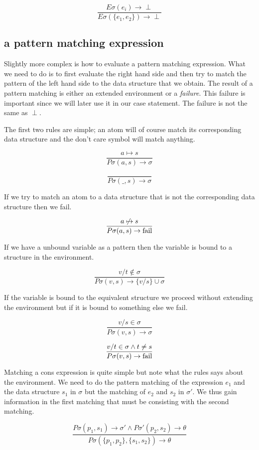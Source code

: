 \documentclass[a4paper,11pt]{article}
\begin{document}
$$\frac{ E\sigma(e_i) \rightarrow \perp }{E\sigma(\lbrace e_1 , e_2\rbrace) \rightarrow \perp}$$


\subsection{a pattern matching expression}

Slightly more complex is how to evaluate a pattern matching
expression. What we need to do is to first evaluate the right hand
side and then try to match the pattern of the left hand side to the
data structure that we obtain. The result of a pattern matching is
either an extended environment or a {\em failure}. This failure is
important since we will later use it in our case statement. The
failure is not the same as $\perp$.

The first two rules are simple; an atom will of course match its
corresponding data structure and the don't care symbol will match
anything.

$$\frac{a \mapsto s}{P\sigma(a, s) \rightarrow \sigma}$$ 

$$\frac{}{P\sigma(\_,s) \rightarrow \sigma}$$

If we try to match an atom to a data structure that is not the
corresponding data structure then we fail.

$$\frac{a \not\mapsto s}{P\sigma(a, s) \rightarrow {\rm fail}}$$ 

If we have a unbound variable as a pattern then the variable is bound to a
structure in the environment. 

$$\frac{v/t \not\in \sigma}{P\sigma(v, s) \rightarrow \lbrace v/s \rbrace \cup \sigma }$$ 

If the variable is bound to the equivalent structure we proceed
without extending the environment but if it is bound to something else
we fail.

$$\frac{v/s \in \sigma}{P\sigma(v, s) \rightarrow \sigma  }$$

$$\frac{v/t \in \sigma \wedge t \not= s}{P\sigma(v, s) \rightarrow  {\rm fail} }$$ 

Matching a cons expression is quite simple but note what the rules
says about the environment. We need to do the pattern matching of the
expression $e_1$ and the data structure $s_1$ in $\sigma$ but the 
matching of $e_2$ and $s_2$ in $\sigma'$. We thus gain information in
the first matching that must be consisting with the second matching.

$$\frac{P\sigma(p_1, s_1) \rightarrow \sigma' \wedge P\sigma'(p_2, s_2) \rightarrow \theta}{P\sigma(\lbrace p_1, p_2 \rbrace  , \lbrace s_1, s_2 \rbrace) \rightarrow \theta}$$
\end{document}

